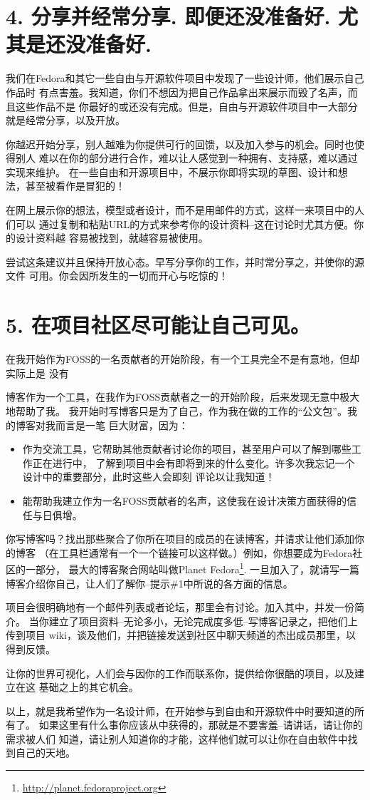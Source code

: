 \section*{4. 分享并经常分享. 即便还没准备好. 尤其是还没准备好.}
我们在Fedora和其它一些自由与开源软件项目中发现了一些设计师，他们展示自己作品时
有点害羞。我知道，你们不想因为把自己作品拿出来展示而毁了名声，而且这些作品不是
你最好的或还没有完成。但是，自由与开源软件项目中一大部分就是经常分享，以及开放。

你越迟开始分享，别人越难为你提供可行的回馈，以及加入参与的机会。同时也使得别人
难以在你的部分进行合作，难以让人感觉到一种拥有、支持感，难以通过实现来维护。
在一些自由和开源项目中，不展示你即将实现的草图、设计和想法，甚至被看作是冒犯的！

在网上展示你的想法，模型或者设计，而不是用邮件的方式，这样一来项目中的人们可以
通过复制和粘贴URL的方式来参考你的设计资料--这在讨论时尤其方便。你的设计资料越
容易被找到，就越容易被使用。

尝试这条建议并且保持开放心态。早写分享你的工作，并时常分享之，并使你的源文件
可用。你会因所发生的一切而开心与吃惊的！

\section*{5. 在项目社区尽可能让自己可见。}
在我开始作为FOSS的一名贡献者的开始阶段，有一个工具完全不是有意地，但却实际上是
没有

博客作为一个工具，在我作为FOSS贡献者之一的开始阶段，后来发现无意中极大地帮助了我。
我开始时写博客只是为了自己，作为我在做的工作的“公文包”。我的博客对我而言是一笔
巨大财富，因为：
\begin{itemize}
 ，这是查找曾经的的设计觉得便捷方式--例如，弄明白当初为什么我们
 要放弃那个屏幕，或者为什么一个特定的方法尝试了却没成功。
 \item 作为交流工具，它帮助其他贡献者讨论你的项目，甚至用户可以了解到哪些工作正在进行中，
 了解到项目中会有即将到来的什么变化。许多次我忘记一个设计中的重要部分，此时这些人会即刻
 评论以让我知道！
 \item 能帮助我建立作为一名FOSS贡献者的名声，这使我在设计决策方面获得的信任与日俱增。
\end{itemize}

你写博客吗？找出那些聚合了你所在项目的成员的在读博客，并请求让他们添加你的博客
（在工具栏通常有一个一个链接可以这样做。）例如，你想要成为Fedora社区的一部分，
最大的博客聚合网站叫做Planet Fedora\footnote{\url{http://planet.fedoraproject.org}}. 
一旦加入了，就请写一篇博客介绍你自己，让人们了解你--提示\#1中所说的各方面的信息。

项目会很明确地有一个邮件列表或者论坛，那里会有讨论。加入其中，并发一份简介。
当你建立了项目资料--无论多小，无论完成度多低--写博客记录之，把他们上传到项目
wiki，谈及他们，并把链接发送到社区中聊天频道的杰出成员那里，以得到反馈。

让你的世界可视化，人们会与因你的工作而联系你，提供给你很酷的项目，以及建立在这
基础之上的其它机会。

以上，就是我希望作为一名设计师，在开始参与到自由和开源软件中时要知道的所有了。
如果这里有什么事你应该从中获得的，那就是不要害羞--请讲话，请让你的需求被人们
知道，请让别人知道你的才能，这样他们就可以让你在自由软件中找到自己的天地。
